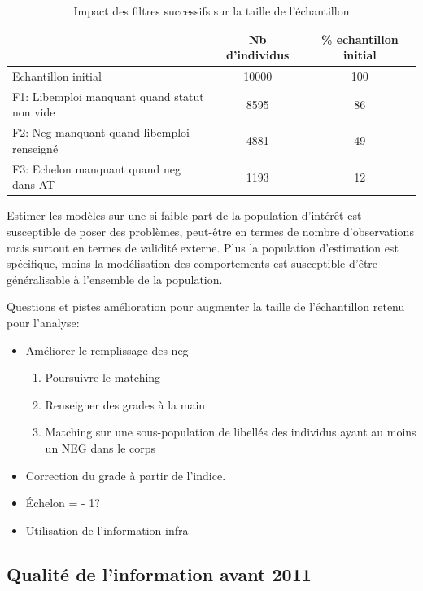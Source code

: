 \documentclass[11pt,a4paper]{article}
\begin{document}
\begin{table}[h!]
\centering
\caption{Impact des filtres successifs sur la taille de l'échantillon} 
\label{filters}
\begin{tabular}{lcc}
\toprule
 & Nb d'individus & \% echantillon initial \\ 
  \hline
Echantillon initial & 10000 & 100 \\ 
F1: Libemploi manquant quand statut non vide & 8595 & 86 \\ 
F2: Neg manquant quand libemploi renseigné & 4881 & 49 \\ 
F3: Echelon manquant quand neg dans AT & 1193 & 12 \\ 
\bottomrule
\end{tabular}
\end{table}


Estimer les modèles sur une si faible part de la population d'intérêt est susceptible de poser des problèmes, peut-être en termes de nombre d'observations mais surtout en termes de validité externe. Plus la population d'estimation est spécifique, moins la modélisation des comportements est susceptible d'être généralisable à l'ensemble de la population. 


Questions et pistes amélioration pour augmenter la taille de l'échantillon retenu pour l'analyse: 
\begin{itemize}[leftmargin=1cm ,parsep=0cm,itemsep=0cm,topsep=0cm] 
\item Améliorer le remplissage des neg 
	\begin{enumerate}[leftmargin=1cm ,parsep=0cm,itemsep=0cm,topsep=0cm] 
	\item Poursuivre le matching
	\item Renseigner des grades à la main 
	\item Matching sur une sous-population de libellés des individus ayant au moins un NEG dans le corps
	\end{enumerate}
\item Correction du grade à partir de l'indice. 
\item Échelon = - 1?
\item Utilisation de l'information infra
\end{itemize}




\subsection{Qualité de l'information avant 2011}
\end{document}
